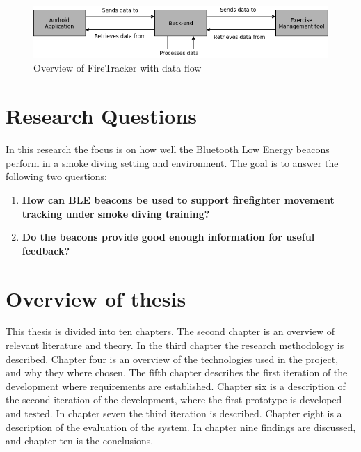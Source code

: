 \documentclass[../Main/thesis.tex]{subfiles}
\begin{document}
\begin{figure}[h]
	\centering
	\includegraphics[width=\textwidth]{../fig/system-overview}
	\caption{Overview of FireTracker with data flow}
	\label{fig:system-overview}
\end{figure}

\section{Research Questions}
\label{ch:reserch_questions}
In this research the focus is on how well the Bluetooth Low Energy beacons perform in a smoke diving setting and environment. 
The goal is to answer the following two questions:

\begin{enumerate}
	\item \textbf{How can BLE beacons be used to support firefighter movement tracking under smoke diving training?}
	\item \textbf{Do the beacons provide good enough information for useful feedback?}
\end{enumerate}


\section{Overview of thesis}
This thesis is divided into ten chapters.
The second chapter is an overview of relevant literature and theory.
In the third chapter the research methodology is described.
Chapter four is an overview of the technologies used in the project, and why they where chosen.
The fifth chapter describes the first iteration of the development where requirements are established.
Chapter six is a description of the second iteration of the development, where the first prototype is developed and tested.
In chapter seven the third iteration is described.
Chapter eight is a description of the evaluation of the system.
In chapter nine findings are discussed, and chapter ten is the conclusions.


\blankpage

\onlyinsubfile{}
\onlyinsubfile{}
\end{document}
